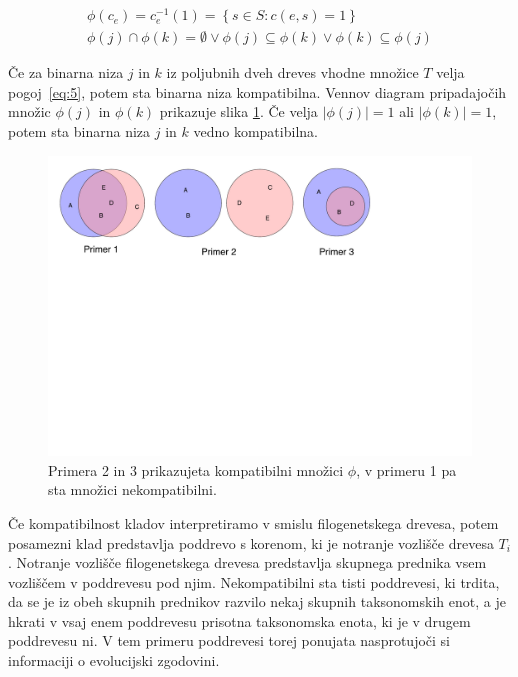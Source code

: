 \documentclass[a4paper, 12pt]{book}
\begin{document}
\begin{align}
	\phi(c_e) = c_e^{-1}(1) = \left\{ s \in S: c(e, s) = 1 \right\} \label{eq:4} \\
	\phi(j) \cap \phi(k) = \emptyset \lor \phi(j) \subseteq \phi(k) \lor \phi(k) \subseteq \phi(j) \label{eq:5}
\end{align} 

\noindent Če za binarna niza $j$ in $k$ iz poljubnih dveh dreves vhodne množice $T$ velja 
pogoj~\ref{eq:5}, potem sta binarna niza kompatibilna. Vennov diagram pripadajočih 
množic $\phi(j)$ in $\phi(k)$ prikazuje slika \ref{img-venn-compatibility}. 
Če velja $\left|\phi(j)\right| = 1$ ali $\left|\phi(k)\right| = 1$, potem 
sta binarna niza $j$ in $k$ vedno kompatibilna.   

\begin{figure}
	\begin{center}
		\includegraphics[scale=0.54, clip=true, trim=0 15cm 0 0]{gfx/venn-amt-compatibility.pdf}
	\end{center}
	\caption{
		Primera 2 in 3 prikazujeta kompatibilni množici $\phi$, v primeru 1 pa 
		sta množici nekompatibilni.
	}
	\label{img-venn-compatibility}
\end{figure}

Če kompatibilnost kladov interpretiramo v smislu filogenetskega drevesa, 
potem posamezni klad predstavlja poddrevo s korenom, ki je notranje vozlišče 
drevesa $T_i$. Notranje vozlišče filogenetskega drevesa predstavlja skupnega 
prednika vsem vozliščem v poddrevesu pod njim. Nekompatibilni sta tisti poddrevesi, 
ki trdita, da se je iz obeh skupnih prednikov razvilo nekaj skupnih taksonomskih 
enot, a je hkrati v vsaj enem poddrevesu prisotna taksonomska enota, ki je v drugem 
poddrevesu ni. V tem primeru poddrevesi torej ponujata nasprotujoči si informaciji
o evolucijski zgodovini. 
\end{document}
